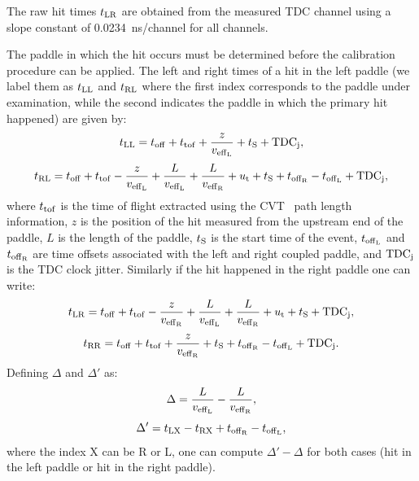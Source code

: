 The raw hit times $t_{\rm{LR}}$ are obtained from the measured TDC channel using a slope constant of 0.0234~ns/channel for all channels.

The paddle in which the hit occurs must be determined before the calibration procedure can be applied.
The left and right times of a hit in the left paddle (we label them as $t_{\rm{LL}}$ and $t_{\rm{RL}}$ where the first index corresponds to the paddle under examination, while the second indicates the paddle in which the primary hit happened) are given by:
\begin{equation}\label{eq_t_LL}
t_{{\rm{LL}}}=t_{\rm{off}}+t_{\rm{tof}}+\frac{z}{v_{\rm{eff}_L}}+t_{\rm{S}}+{\rm{TDC}}_{\rm{j}},
\end{equation}
\begin{equation}\label{eq_t_RL}
t_{{\rm{RL}}}=t_{\rm{off}}+t_{\rm{tof}}-\frac{z}{v_{\rm{eff}_L}}+\frac{L}{v_{\rm{eff}_L}}+\frac{L}{v_{\rm{eff}_{\rm{R}}}}+u_{\rm{t}}+t_{\rm{S}}+t_{\rm{off}_{\rm{R}}}-t_{\rm{off}_{\rm{L}}}+{\rm{TDC}}_{\rm{j}},
\end{equation}
where $t_{\rm{tof}}$ is the time of flight extracted using the CVT~\cite{svt-nim,mm-nim} path length information, $z$ is the position of the hit measured from the upstream end of the paddle, $L$ is the length of the paddle, $t_{\rm{S}}$ is the start time of the event, $t_{\rm{off}_{\rm{L}}}$ and $t_{\rm{off}_{\rm{R}}}$ are time offsets associated with the left and right coupled paddle, and ${\rm{TDC}}_{\rm{j}}$ is the TDC clock jitter.
Similarly if the hit happened in the right paddle one can write:
\begin{equation}\label{eq_time_hit_lr}
t_{{\rm{LR}}}=t_{\rm{off}}+t_{\rm{tof}}-\frac{z}{v_{\rm{eff}_{\rm{R}}}}+\frac{L}{v_{\rm{eff}_L}}+\frac{L}{v_{\rm{eff}_{\rm{R}}}}+u_{\rm{t}}+t_{\rm{S}}+{\rm{TDC}}_{\rm{j}},
\end{equation}
\begin{equation}\label{eq_time_hit_rr}
t_{\rm{RR}}=t_{\rm{off}}+t_{\rm{tof}}+\frac{z}{v_{\rm{eff}_{\rm{R}}}}+t_{\rm{S}}+t_{\rm{off}_{\rm{R}}}-t_{\rm{off}_{\rm{L}}}+{\rm{TDC}}_{\rm{j}}.
\end{equation}
Defining $\Delta$ and $\Delta'$ as:
\begin{equation}
\Delta=\frac{L}{v_{\rm{eff}_L}}-\frac{L}{v_{\rm{eff}_{\rm{R}}}},
\end{equation}
\begin{equation}
\Delta'=t_{\rm{LX}}-t_{\rm{RX}}+t_{\rm{off}_{\rm{R}}}-t_{\rm{off}_{\rm{L}}},
\end{equation}
where the index X can be R or L, one can compute $\Delta'-\Delta$ for both cases (hit in the left paddle or hit in the right paddle).
